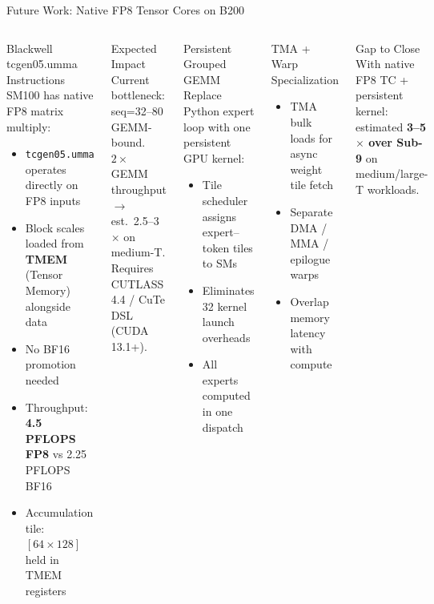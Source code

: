 \begin{frame}{Future Work: Native FP8 Tensor Cores on B200}
\begin{columns}[T]
\begin{block}{Blackwell tcgen05.umma Instructions}
\small
SM100 has native FP8 matrix multiply:
\begin{itemize}\small
  \item \texttt{tcgen05.umma} operates directly on FP8 inputs
  \item Block scales loaded from \textbf{TMEM} (Tensor Memory) alongside data
  \item No BF16 promotion needed
  \item Throughput: \textbf{4.5 PFLOPS FP8} vs 2.25 PFLOPS BF16
  \item Accumulation tile: $[64\times128]$ held in TMEM registers
\end{itemize}
\end{block}

\begin{exampleblock}{\small Expected Impact}
\small
Current bottleneck: seq=32--80 GEMM-bound.\\
$2\times$ GEMM throughput $\to$ est.\ 2.5--3$\times$ on medium-T.\\
Requires CUTLASS 4.4 / CuTe DSL (CUDA 13.1+).
\end{exampleblock}

\begin{block}{\small Persistent Grouped GEMM}
\small
Replace Python expert loop with one persistent GPU kernel:
\begin{itemize}\small
  \item Tile scheduler assigns expert--token tiles to SMs
  \item Eliminates 32 kernel launch overheads
  \item All experts computed in one dispatch
\end{itemize}
\end{block}

\begin{block}{\small TMA + Warp Specialization}
\small
\begin{itemize}\small
  \item TMA bulk loads for async weight tile fetch
  \item Separate DMA / MMA / epilogue warps
  \item Overlap memory latency with compute
\end{itemize}
\end{block}

\begin{alertblock}{\small Gap to Close}
\scriptsize
With native FP8 TC + persistent kernel:\\
estimated \textbf{3--5$\times$ over Sub-9} on\\
medium/large-T workloads.
\end{alertblock}
\end{columns}
\end{frame}

